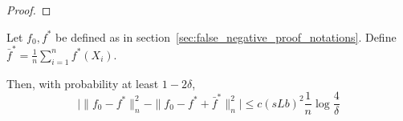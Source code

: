 \begin{proof}




\end{proof}



\begin{lemma}
\label{lem:remove_centering}

Let $f_0, f^*$ be defined as in section~\ref{sec:false_negative_proof_notations}. Define $\bar{f}^* = \frac{1}{n} \sum_{i=1}^n f^*(X_i)$.

Then, with probability at least $1 - 2\delta$,
\[
\Big | \| f_0 - f^* \|_n^2 - \| f_0 - f^* + \bar{f}^* \|_n^2 \Big| \leq
    c (sLb)^2 \frac{1}{n} \log \frac{4}{\delta}
\]
\end{lemma}

